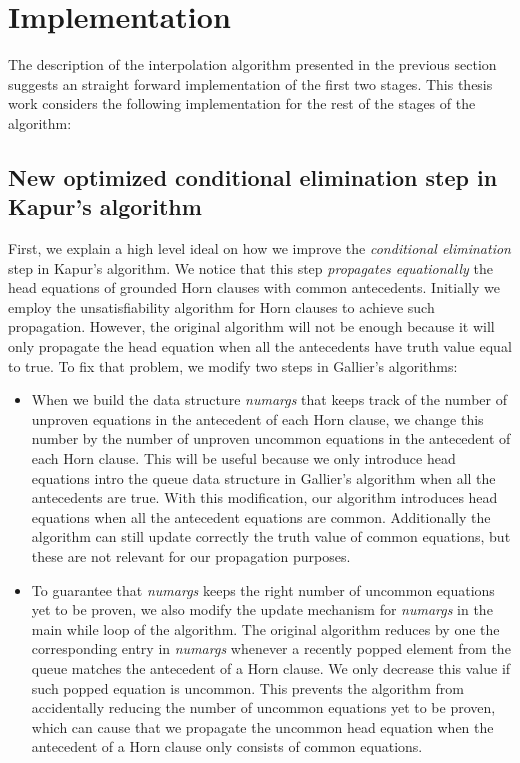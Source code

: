 \section{Implementation}

The description of the interpolation algorithm presented in the
previous section suggests an straight forward implementation
of the first two stages. This thesis work considers the following
implementation for the rest of the stages of the algorithm:

\subsection{New optimized conditional elimination step in Kapur's algorithm}

First, we explain a high level ideal on how 
we improve the \emph{conditional elimination}
step in Kapur's algorithm. We notice that this 
step \emph{propagates equationally} the
head equations of grounded Horn clauses with 
common antecedents. Initially we employ the
unsatisfiability algorithm for Horn clauses 
to achieve such propagation. However, the original
algorithm will not be enough because it will 
only propagate the head equation when all the
antecedents have truth value equal to 
true. To fix that problem, we modify two steps in Gallier's
algorithms:

\begin{itemize}
  \item When we build the data structure \emph{numargs} that keeps 
    track of the number of unproven
    equations in the antecedent of each Horn clause, we change 
    this number by the number
    of unproven uncommon equations in the antecedent of each 
    Horn clause. This will be useful
    because we only introduce head equations intro the queue 
    data structure in Gallier's algorithm
    when all the antecedents are true. With this 
    modification, our algorithm introduces head equations
    when all the antecedent equations are common. 
    Additionally the algorithm can still update
    correctly the truth value of common equations, 
    but these are not relevant for our propagation
    purposes.
  \item To guarantee that \emph{numargs} keeps the 
    right number of uncommon equations yet to
    be proven, we also modify the update mechanism for 
    \emph{numargs} in the main while loop of the algorithm.
    The original algorithm reduces by one the 
    corresponding entry in \emph{numargs}
    whenever a recently popped element from the queue 
    matches the antecedent of a Horn clause. We only
    decrease this value if such popped equation is uncommon. 
    This prevents the algorithm from accidentally
    reducing the number of uncommon equations yet to be proven, 
    which can cause that we propagate the
    uncommon head equation when the antecedent of a Horn 
    clause only consists of common equations.
\end{itemize}

